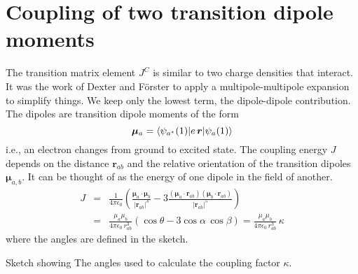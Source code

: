 \section{Coupling of two transition dipole moments}

The transition matrix element $J^C$ is similar to two charge densities that interact. It was the work of Dexter and Förster to apply a multipole-multipole expansion to simplify things. We keep only the lowest term, the dipole-dipole contribution. The dipoles are transition dipole moments of the form
\begin{equation}
   \boldsymbol{\mu}_a = \braket{ \psi_{a^\star}(1)| e \, \boldsymbol{r} |  \psi_{a}(1) }
\end{equation}
i.e., an electron changes from ground to excited state.
%
The coupling energy $J$ depends on the distance $\boldsymbol{r}_{ab}$ and the relative orientation of the transition dipoles $\boldsymbol{\mu}_{a,b}$. It can be thought of as the energy of one dipole in the field of another.
\begin{eqnarray}
 J & = & \frac{1}{4 \pi \epsilon_0}  \left( \frac{\boldsymbol{\mu}_a \cdot \boldsymbol{\mu}_b }{|\boldsymbol{r}_{ab}|^3} 
  - 3 \frac{ (\boldsymbol{\mu}_a \cdot \boldsymbol{r}_{ab}) (\boldsymbol{\mu}_b \cdot \boldsymbol{r}_{ab})
  }{ |\boldsymbol{r}_{ab}|^5 }  \right)\\
   & = & \frac{\mu_a \mu_b }{4 \pi \epsilon_0 \, r_{ab}^3} \left( \cos \theta - 3 \cos \alpha \, \cos \beta \right) = \frac{\mu_a \mu_b }{4 \pi \epsilon_0 \,r_{ab}^3} \, \kappa  
\end{eqnarray}
where the angles are defined in the sketch.

\begin{marginfigure}

\caption{Sketch showing 
The angles used to calculate the coupling factor $\kappa$.}
\end{marginfigure}

